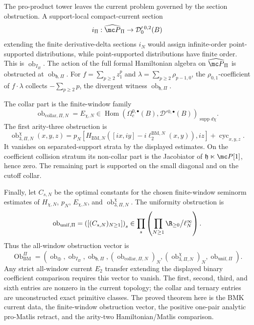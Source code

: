 \begin{thm}
  The pro-product tower leaves the current problem governed by the section
  obstruction.  A support-local compact-current section
  \[
    i_\Pi:\widehat{\mc P}_{\Pi}\to\mathcal D'_0{}^{0,2}(B)
  \]
  extending the finite derivative-delta sections \(i_N\) would assign
  infinite-order point-supported distributions, while point-supported
  distributions have finite order.  This is
  \(\operatorname{ob}_{I_\Pi}\).  The action of the full formal
  Hamiltonian algebra on \(\widehat{\mc P}_{\Pi}\) is obstructed at
  \(\operatorname{ob}_{\mathfrak h,\Pi}\).  For
  \(f=\sum_{p\ge2}z_1^p\) and \(\lambda=\sum_{p\ge2}\rho_{p-1,0}\), the
  \(\rho_{0,1}\)-coefficient of \(f\cdot\lambda\) collects
  \(-\sum_{p\ge2}p\), the divergent witness
  \(\operatorname{ob}_{\mathfrak h,\Pi}\).

  The collar part is the finite-window family
  \[
    \operatorname{ob}_{\mathrm{collar},\Pi,N}
      =
      E_{\chi,N}
      \in
      \operatorname{Hom}\!
      \left(\Omega_c^{0,\bullet}(B),
      \mathcal D'{}^{0,\bullet}(B)\right)_{\operatorname{supp}d\chi}.
  \]
  The first arity-three obstruction is
  \[
    \operatorname{ob}^{\chi}_{3,\Pi,N}(x,y,z)
      =
      p_N[H_{\mathrm{BM},N}([ix,iy]-i\ell^{\mathrm{BM},N}_2(x,y)),iz]
      +\operatorname{cyc}_{x,y,z}.
  \]
  It vanishes on separated-support strata by the displayed estimates.
  On the coefficient collision stratum its non-collar part is the
  Jacobiator of \(\mathfrak h\ltimes\mc P[1]\), hence zero.  The
  remaining part is supported on the small diagonal and on the cutoff
  collar.

  Finally, let \(C_{s,N}\) be the optimal constants for the chosen
  finite-window seminorm estimates of
  \(H_{\chi,N}\), \(p_N\), \(E_{\chi,N}\), and
  \(\operatorname{ob}^{\chi}_{3,\Pi,N}\).  The uniformity obstruction is
  \[
    \operatorname{ob}_{\mathrm{unif},\Pi}
      =
      \left(\left[(C_{s,N})_{N\geq1}\right]\right)_s
      \in
      \prod_s
      \left(
        \prod_{N\geq1}\R_{\geq0}\big/\ell^\infty_N
      \right).
  \]
  Thus the all-window obstruction vector is
  \[
    \operatorname{Ob}^{\Pi}_{\mathrm{BM}}
      =
      \left(
      \operatorname{ob}_{\oplus},
      \operatorname{ob}_{I_\Pi},
      \operatorname{ob}_{\mathfrak h,\Pi},
      (\operatorname{ob}_{\mathrm{collar},\Pi,N})_N,
      (\operatorname{ob}^{\chi}_{3,\Pi,N})_N,
      \operatorname{ob}_{\mathrm{unif},\Pi}
      \right).
  \]
  Any strict all-window current \(E_2\) transfer extending the
  displayed binary coefficient comparison requires this vector to vanish.
  The first, second, third, and sixth entries are nonzero in the
  current topology; the collar and ternary entries are unconstructed
  exact primitive classes.  The proved theorem here is the BMK current data,
  the finite-window obstruction vector, the positive one-pair analytic
  pro-Matlis retract, and the arity-two Hamiltonian/Matlis comparison.


\end{thm}
